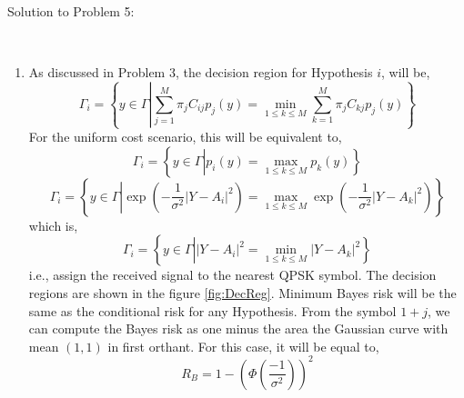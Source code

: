 \documentclass[a4paper,english,10pt]{article}
\begin{document}
\hypertarget{solution5}{ Solution to Problem 5:}\\
\begin{enumerate}[label=(\alph{*}).]
\item As discussed in Problem 3, the decision region for Hypothesis $i$, will be,
\begin{equation*}
\Gamma_i=\left\lbrace y\in \Gamma \left| \sum\limits_{j=1}^{M}\pi_jC_{ij}p_j(y)=\underset{1\leq k\leq M}{\min} \sum\limits_{k=1}^{M}\pi_jC_{kj}p_j(y)\right.\right\rbrace
\end{equation*}
For the uniform cost scenario, this will be equivalent to,
\begin{equation*}
\Gamma_i=\left\lbrace y\in \Gamma \left| p_i(y)=\underset{1\leq k\leq M}{\max} p_k(y)\right.\right\rbrace
\end{equation*}
\begin{equation*}
\Gamma_i=\left\lbrace y\in \Gamma \left| \exp\left(-\frac{1}{\sigma^2}|Y-A_i|^2\right)=\underset{1\leq k\leq M}{\max} \exp\left(-\frac{1}{\sigma^2}|Y-A_k|^2\right)\right.\right\rbrace
\end{equation*}
which is,
\begin{equation*}
\Gamma_i=\left\lbrace y\in \Gamma \left| |Y-A_i|^2=\underset{1\leq k\leq M}{\min} |Y-A_k|^2\right.\right\rbrace
\end{equation*}
i.e., assign the received signal to the nearest QPSK symbol. The decision regions are shown in the figure \ref{fig:DecReg}.
Minimum Bayes risk will be the same as the conditional risk for any Hypothesis. From the symbol $1+j$, we can compute the Bayes risk as one minus the area the Gaussian curve with mean $(1,1)$ in first orthant. For this case, it will be equal to,
\begin{equation*}
R_B=1-\left(\Phi\left(\frac{-1}{\sigma^2}\right)\right)^2
\end{equation*}
\begin{figure}[h]
\begin{minipage}[b]{0.45\textwidth}

\end{minipage}
\end{figure}
\end{enumerate}
\end{document}
